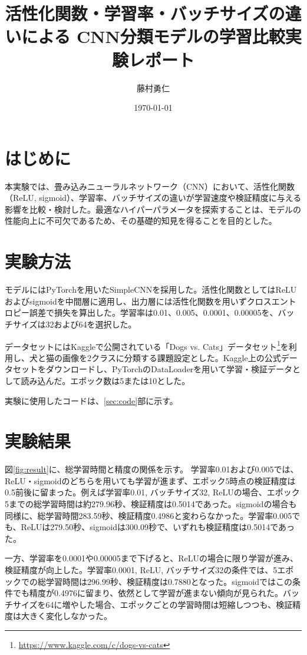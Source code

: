 \documentclass{ltjsarticle}
\title{
    活性化関数・学習率・バッチサイズの違いによる
    CNN分類モデルの学習比較実験レポート
}
\author{藤村勇仁}
\date{\today}
\begin{document}


\TableOfContents

\section{はじめに}
本実験では、畳み込みニューラルネットワーク（CNN）において、活性化関数（ReLU, sigmoid）、学習率、バッチサイズの違いが学習速度や検証精度に与える影響を比較・検討した。最適なハイパーパラメータを探索することは、モデルの性能向上に不可欠であるため、その基礎的知見を得ることを目的とした。

\section{実験方法}
モデルにはPyTorchを用いたSimpleCNNを採用した。活性化関数としてはReLUおよびsigmoidを中間層に適用し、出力層には活性化関数を用いずクロスエントロピー誤差で損失を算出した。学習率は0.01、0.005、0.0001、0.00005を、バッチサイズは32および64を選択した。

データセットにはKaggleで公開されている「Dogs vs. Cats」データセット\footnote{\url{https://www.kaggle.com/c/dogs-vs-cats}}を利用し、犬と猫の画像を2クラスに分類する課題設定とした。Kaggle上の公式データセットをダウンロードし、PyTorchのDataLoaderを用いて学習・検証データとして読み込んだ。エポック数は5または10とした。

実験に使用したコードは、\ref{sec:code}部に示す。

\section{実験結果}
図\ref{fig:result}に、総学習時間と精度の関係を示す。
学習率0.01および0.005では、ReLU・sigmoidのどちらを用いても学習が進まず、エポック5時点の検証精度は0.5前後に留まった。例えば学習率0.01, バッチサイズ32, ReLUの場合、エポック5までの総学習時間は約279.96秒、検証精度は0.5014であった。sigmoidの場合も同様に、総学習時間283.59秒、検証精度0.4986と変わらなかった。学習率0.005でも、ReLUは279.50秒、sigmoidは300.09秒で、いずれも検証精度は0.5014であった。

一方、学習率を0.0001や0.00005まで下げると、ReLUの場合に限り学習が進み、検証精度が向上した。学習率0.0001, ReLU, バッチサイズ32の条件では、5エポックでの総学習時間は296.99秒、検証精度は0.7880となった。sigmoidではこの条件でも精度が0.4976に留まり、依然として学習が進まない傾向が見られた。バッチサイズを64に増やした場合、エポックごとの学習時間は短縮しつつも、検証精度は大きく変化しなかった。
\end{document}
